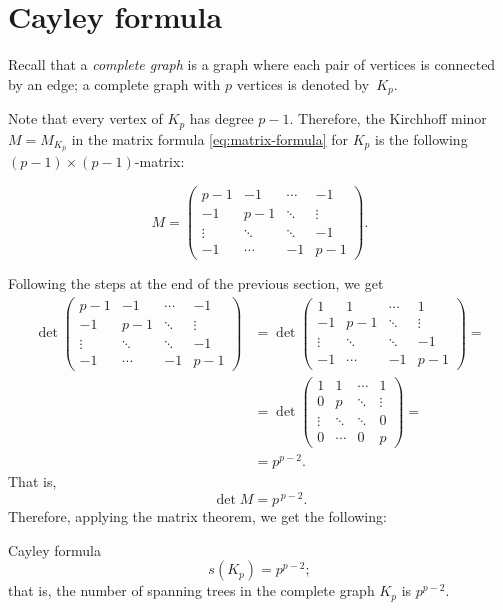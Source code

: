 \section{Cayley formula}

Recall that a \emph{complete graph} is a graph where each pair of vertices is connected by an edge;
a complete graph with $p$ vertices is denoted by~$K_p$.

Note that every vertex of $K_p$ has degree $p-1$.
Therefore, the Kirchhoff minor $M=M_{K_p}$ in the matrix formula \ref{eq:matrix-formula} for $K_p$ is the following $(p-1)\times (p-1)$-matrix:

\[
M=\left(
\begin{matrix}
p{-}1&-1&\cdots&-1
\\
-1&p{-}1&\ddots&\vdots
\\
\vdots&\ddots&\ddots&-1
\\
-1&\cdots&-1&p{-}1
\end{matrix}
\right).
\]

Following the steps at the end of the previous section, we get
\begin{align*}
\det\left(
\begin{matrix}
p{-}1&-1&\cdots&-1
\\
-1&p{-}1&\ddots&\vdots
\\
\vdots&\ddots&\ddots&-1
\\
-1&\cdots&-1&p{-}1
\end{matrix}
\right)
&=\det\left(
\begin{matrix}
1&1&\cdots&1
\\
-1&p{-}1&\ddots&\vdots
\\
\vdots&\ddots&\ddots&-1
\\
-1&\cdots&-1&p{-}1
\end{matrix}
\right)
=
\\
&=
\det\left(
\begin{matrix}
1&1&\cdots&1
\\
0&p&\ddots&\vdots
\\
\vdots&\ddots&\ddots&0
\\
0&\cdots&0&p
\end{matrix}
\right)=
\\
&=  p^{p-2}.
\end{align*}
That is,
\[\det M=p^{\,p-2}.\]
Therefore, applying the matrix theorem, we get the following:

\begin{thm}{Cayley formula}\label{thm:cayley}
 \[s(K_p)=p^{p-2};\]
that is, the number of spanning trees in the complete graph $K_p$ is $p^{p-2}$.
\end{thm}


